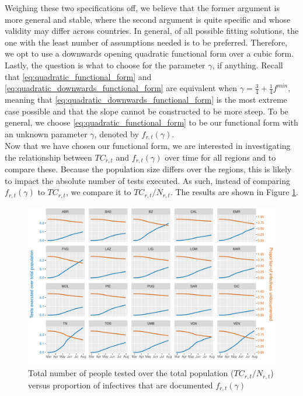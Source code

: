 \documentclass[12pt]{article}
\begin{document}
    Weighing these two specifications off, we believe that the former argument is more general and stable, where the second argument is quite specific and whose validity may differ across countries. In general, of all possible fitting solutions, the one with the least number of assumptions needed is to be preferred. Therefore, we opt to use a downwards opening quadratic functional form over a cubic form. \\
    
    Lastly, the question is what to choose for the parameter $\gamma$, if anything. Recall that \eqref{eq:quadratic_functional_form} and \eqref{eq:quadratic_downwards_functional_form} are equivalent when $\gamma = \frac{3}{4} + \frac{1}{4}f^{min}$, meaning that \eqref{eq:quadratic_downwards_functional_form} is the most extreme case possible and that the slope cannot be constructed to be more steep. To be general, we choose \eqref{eq:quadratic_functional_form} to be our functional form with an unknown parameter $\gamma$, denoted by $f_{r,t}(\gamma)$. \\
	
	Now that we have chosen our functional form, we are interested in investigating the relationship between $TC_{r,t}$ and $f_{r,t}(\gamma)$ over time for all regions and to compare these. Because the population size differs over the regions, this is likely to impact the absolute number of tests executed. As such, instead of comparing $f_{r,t}(\gamma)$ to $TC_{r,t}$, we compare it to $TC_{r,t} / N_{r,t}$. The results are shown in Figure \ref{fig:tamponiprop_versus_ft}. \\
	
	\begin{figure}[ht]
	    \centering
	    \includegraphics[width=\textwidth]{output/tamponiprop_vs_ft.pdf}
	    \caption{Total number of people tested over the total population ($TC_{r,t} / N_{r,t}$) versus proportion of infectives that are documented $f_{r,t}(\gamma)$}
	    \label{fig:tamponiprop_versus_ft}
	\end{figure}
	
\end{document}
